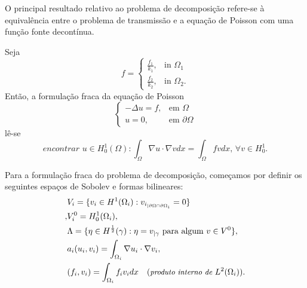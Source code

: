 \documentclass[portuguese,notheorems]{beamer}
\begin{document}
\begin{frame}
    O principal resultado relativo ao problema de decomposição refere-se à equivalência entre o problema de transmissão e a equação de Poisson com uma função fonte decontínua.

    Seja
    \[
        f = \begin{cases}
    \frac{f_1}{k_1},& \text{in } \Omega_1\\
    \frac{f_2}{k_2},& \text{in } \Omega_2.
\end{cases}
    \]
    Então, a formulação fraca da equação de Poisson
    $$
        \begin{cases}
            -\Delta u = f, &\text{em } \Omega \\
            u = 0, &\text{em } \partial\Omega
        \end{cases}
    $$
    \pause
    lê-se
    $$
        \textit{encontrar } u \in H^1_0(\Omega): \int_{\Omega} \nabla u \cdot \nabla v dx = \int_\Omega f v dx, \, \forall v \in H^1_0.
    $$
\end{frame}

\begin{frame}
Para a formulação fraca do problema de decomposição, começamos por definir os seguintes espaços de Sobolev e formas bilineares:
    \begin{align*}
        &V_i = \{v_i \in H^1(\Omega_i): v_{i_{|\partial \Omega \cap \partial {\Omega_i}}}=0\}\\,
        &V_i^0 = H^1_0(\Omega_i), \\
        &\Lambda = \{\eta \in H^\frac{1}{2}(\gamma): \eta = v_{|\gamma} \text{ para algum } v \in V^0\},\\
        &a_i (u_i, v_i) = \int_{\Omega_i} \nabla u_i \cdot \nabla v_i,\\
        &(f_i, v_i) = \int_{\Omega_i} f_i v_i dx \quad (\small \textit{produto interno de } L^2(\Omega_i)).
    \end{align*}
\end{frame}
\end{document}
